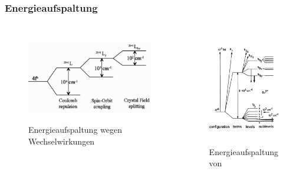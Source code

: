 \documentclass{beamer}
\begin{document}
\begin{frame}[t]\frametitle{Energieaufspaltung}
     \begin{columns}
              \begin{figure}[!h]
\centering
      \includegraphics[height=4cm]{pics/aufspaltung.jpg}
      \caption*{\tiny Energieaufspaltung wegen Wechselwirkungen}
 \end{figure}
  
 \begin{figure}[!h]
\centering
      \includegraphics[height=5cm]{pics/levels.jpg}
     
      \caption*{\tiny Energieaufspaltung von }
 \end{figure}
      \end{columns}


\end{frame}
\end{document}
